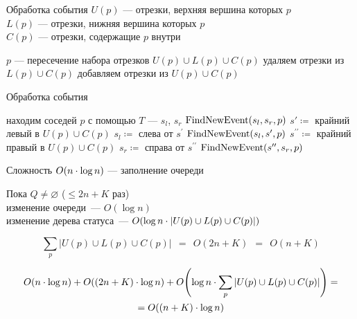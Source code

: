 \begin{frame}{Обработка события}
    $U(p)$ --- отрезки, верхняя вершина которых $p$ \\ %
    $L(p)$ --- отрезки, нижняя вершина которых $p$ \\
    $C(p)$ --- отрезки, содержащие $p$ внутри \medskip \\

 \begin{algorithmic}
        \State $p$ --- пересечение набора отрезков $U(p) \cup L(p) \cup C(p)$
    \EndIf
    \State удаляем отрезки из $L(p) \cup C(p)$
    \State добавляем отрезки из $U(p) \cup C(p)$
 \end{algorithmic}
\end{frame}

\begin{frame}{Обработка события}
 \begin{algorithmic}
        \State находим соседей $p$ с помощью $T$ --- $s_l$, $s_r$
        \State $\text{FindNewEvent}\lr*{s_l,s_r,p}$
    \Else 
        \State $s' \coloneqq$ крайний левый в $U(p) \cup C(p)$
        \State $s_l \coloneqq$ слева от $s^{\prime}$
        \State $\text{FindNewEvent}\lr*{s_l,s^{\prime},p}$
        \State $s^{\prime\prime} \coloneqq$ крайний правый в $U(p) \cup C(p)$
        \State $s_r \coloneqq$ справа от $s^{\prime\prime}$
        \State $\text{FindNewEvent}\lr*{s^{\prime\prime},s_r,p}$
    \EndIf
\end{algorithmic} 
\end{frame}

\begin{frame}{Сложность}
    $O\lr*{n \cdot \log n}$ --- заполнение очереди

    Пока $Q \neq \varnothing$ ($\leq 2n+K$ раз) \\
    \qquad изменение очереди~— $O(\log n)$ \\
    \qquad изменение дерева статуса~—
        $O\lr*{\log n \cdot \left|U(p) \cup L(p) \cup C(p)\right|}$
        \vspace{-6mm}

   \[ \sum\limits_{p}|U(p) \cup L(p) \cup C(p)|\ \ =\ \ O(2n+K)\ \ =\ \ O(n+K) \]
   \vspace{-16mm}

  \begin{multline*}
     O\lr*{n \cdot \log n} + O\lr*{\lr*{2n+K} \cdot \log n} +
       O\lr*{\log n \cdot \sum\limits_{p}|U(p) \cup L(p) \cup C(p)|} = \\
       = O\lr*{\lr*{n+K}\cdot \log n}
  \end{multline*}
\end{frame}
